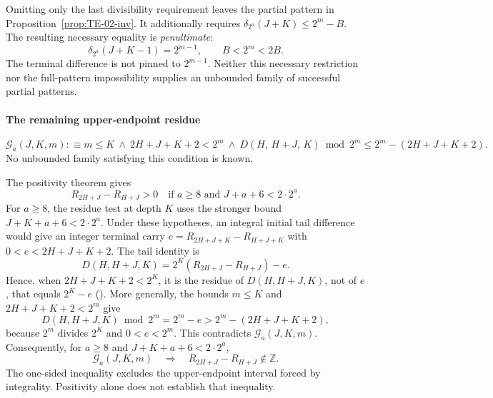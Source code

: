 Omitting only the last divisibility requirement leaves the partial
pattern in Proposition~\ref{prop:TE-02-inv}. It additionally requires
$\delta_{2^a}(J+K)\le2^m-B$. The resulting necessary equality is
\emph{penultimate}:
\[
 \delta_{2^a}(J+K-1)=2^{m-1},\qquad B<2^m<2B.
\]
The terminal difference is not pinned to $2^{m-1}$. Neither this
necessary restriction nor the full-pattern impossibility supplies an
unbounded family of successful partial patterns.

\paragraph{The remaining upper-endpoint residue}
\[
  \mathcal G_a(J,K,m) :\equiv
  m\le K\ \wedge\
  2H+J+K+2 < 2^m\ \wedge\
  D(H,\,H+J,\,K) \bmod 2^m \le 2^m - (2H+J+K+2).
\]
No unbounded family satisfying this condition is known.

The positivity theorem gives
\[
 R_{2H+J}-R_{H+J}>0
 \quad\text{if }a\ge8\text{ and }J+a+6<2\cdot2^a.
\]
For $a\ge8$, the residue test at depth $K$ uses the stronger bound
$J+K+a+6<2\cdot2^a$. Under these hypotheses, an integral initial
tail difference would give an integer terminal carry
$e=R_{2H+J+K}-R_{H+J+K}$ with $0<e<2H+J+K+2$. The tail identity is
\[
 D(H,H+J,K)=2^K(R_{2H+J}-R_{H+J})-e.
\]
Hence, when $2H+J+K+2<2^K$, it is the residue of $D(H,H+J,K)$,
not of $e$, that equals $2^K-e$
().
More generally, the bounds $m\le K$ and $2H+J+K+2<2^m$ give
\[
 D(H,H+J,K)\bmod2^m=2^m-e>2^m-(2H+J+K+2),
\]
because $2^m$ divides $2^K$ and $0<e<2^m$. This contradicts
$\mathcal G_a(J,K,m)$. Consequently, for $a\ge8$ and
$J+K+a+6<2\cdot2^a$,
\[
 \mathcal G_a(J,K,m)\quad\Longrightarrow\quad
       R_{2H+J}-R_{H+J}\notin\mathbb Z.
\]
The one-sided inequality excludes the upper-endpoint interval forced
by integrality. Positivity alone does not establish that inequality.

